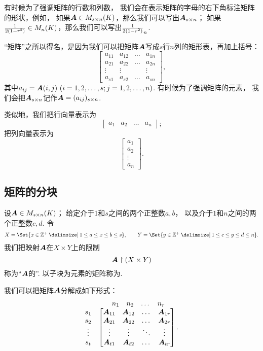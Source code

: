 有时候为了强调矩阵的行数和列数，
我们会在表示矩阵的字母的右下角标注矩阵的形状，例如，
如果\(\boldsymbol{A}\in M_{s \times n}(K)\)，那么我们可以写出\(\boldsymbol{A}_{s \times n}\)；
如果\(\frac{1}{2(1-r^2)}\in M_n(K)\)，那么我们可以写出\(\frac{1}{2(1-r^2)}_n\).

“矩阵”之所以得名，是因为我们可以把矩阵\(\boldsymbol{A}\)写成\(s\)行\(n\)列的矩形表，再加上括号：\[
	\begin{bmatrix}
		a_{11} & a_{12} & \dots & a_{1n} \\
		a_{21} & a_{22} & \dots & a_{2n} \\
		\vdots & \vdots & & \vdots \\
		a_{s1} & a_{s2} & \dots & a_{sn}
	\end{bmatrix},
\]
其中\(a_{ij}=\A(i,j)\ (i=1,2,\dotsc,s;j=1,2,\dotsc,n)\).
有时候为了强调矩阵的元素，
我们会把\(\boldsymbol{A}_{s \times n}\)记作\(\boldsymbol{A}=(a_{ij})_{s \times n}\).

类似地，我们把行向量表示为\[
	\begin{bmatrix}
		a_1 & a_2 & \dots & a_n
	\end{bmatrix};
\]
把列向量表示为\[
	\begin{bmatrix}
		a_1 \\ a_2 \\ \vdots \\ a_n
	\end{bmatrix}.
\]

\subsection{矩阵的分块}
\begin{definition}
设\(\boldsymbol{A}\in M_{s \times n}(K)\)；
给定介于\(1\)和\(s\)之间的两个正整数\(a,b\)，
以及介于\(1\)和\(n\)之间的两个正整数\(c,d\).
令\[
	X=\Set{ x\in\mathbb{Z}^+ \given 1 \leq a \leq x \leq b \leq s },
	\qquad
	Y=\Set{ y\in\mathbb{Z}^+ \given 1 \leq c \leq y \leq d \leq n }.
\]
我们把映射\(\boldsymbol{A}\)在\(X \times Y\)上的限制\[
	\boldsymbol{A}\upharpoonright(X \times Y)
\]称为“\(\boldsymbol{A}\)的”.
以子块为元素的矩阵称为.
\end{definition}

我们可以把矩阵\(\boldsymbol{A}\)分解成如下形式：
\[
	\begin{matrix}
		& \begin{matrix} n_1 & n_2 & \dots & n_r \end{matrix} \\
			\begin{matrix} s_1 \\ s_2 \\ \vdots \\ s_t \end{matrix} & \begin{bmatrix}
			\boldsymbol{A}_{11} & \boldsymbol{A}_{12} & \dots & \boldsymbol{A}_{1r} \\
			\boldsymbol{A}_{21} & \boldsymbol{A}_{22} & \dots & \boldsymbol{A}_{2r} \\
			\vdots & \vdots & \ddots & \vdots \\
			\boldsymbol{A}_{t1} & \boldsymbol{A}_{t2} & \dots & \boldsymbol{A}_{tr}
		\end{bmatrix}.
	\end{matrix}
\]

